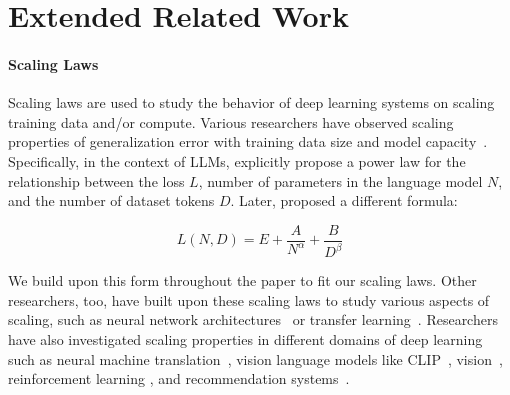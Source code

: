 \section{Extended Related Work}\label{sec:rw}

\paragraph{Scaling Laws} Scaling laws are used to study the behavior of deep learning systems on scaling training data and/or compute. Various researchers have observed scaling properties of generalization error with training data size and model capacity~\citep{banko2001scaling,hestness2017deep,amodei2016deep}. Specifically, in the context of LLMs, \citet{kaplan2020scaling} explicitly propose a power law for the relationship between the loss $L$, number of parameters in the language model $N$, and the number of dataset tokens $D$. Later, \citet{hoffmann2022training} proposed a different formula:

\begin{equation}
    L(N, D) = E + \frac{A}{N^\alpha} + \frac{B}{D^\beta} 
\end{equation}

We build upon this form throughout the paper to fit our scaling laws. Other researchers, too, have built upon these scaling laws to study various aspects of scaling, such as neural network architectures~\citep{clark2022unified,tay2022scaling,frantar2023scaling,gu2023mamba,scao2022language} or transfer learning~\citep{henighan2020scaling}. Researchers have also investigated scaling properties in different domains of deep learning such as neural machine translation~\citep{ghorbani2021scaling,gordon2021data}, vision language models like CLIP~\citep{cherti2023reproducible,henighan2020scaling}, vision~\citep{alabdulmohsin2022revisiting,zhai2022scaling}, reinforcement learning \citep{hilton2023scaling,jones2021scaling, gao2023scaling}, and recommendation systems~\citep{ardalani2022understanding}. 


